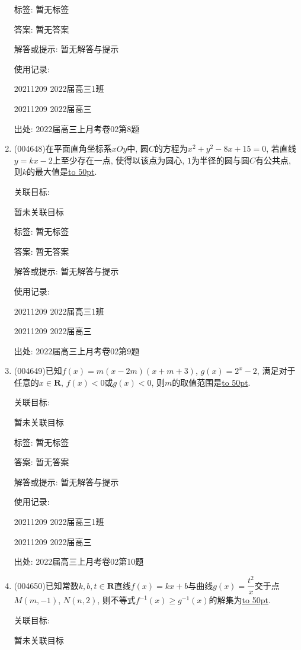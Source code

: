 \documentclass[10pt,a4paper]{article}
\newcommand{\blank}[1]{\underline{\hbox to #1pt{}}}
\begin{document}
\begin{enumerate}[1.]
标签: 暂无标签

答案: 暂无答案

解答或提示: 暂无解答与提示

使用记录:

20211209	2022届高三1班	

20211209	2022届高三	


出处: 2022届高三上月考卷02第8题
\item { (004648)}在平面直角坐标系$xOy$中, 圆$C$的方程为$x^2+y^2-8x+15=0$, 若直线$y=kx-2$上至少存在一点, 使得以该点为圆心, $1$为半径的圆与圆$C$有公共点, 则$k$的最大值是\blank{50}.


关联目标:

暂未关联目标



标签: 暂无标签

答案: 暂无答案

解答或提示: 暂无解答与提示

使用记录:

20211209	2022届高三1班	

20211209	2022届高三	


出处: 2022届高三上月考卷02第9题
\item { (004649)}已知$f(x)=m(x-2m)(x+m+3)$, $g(x)=2^x-2$, 满足对于任意的$x\in \mathbf{R}$, $f(x)<0$或$g(x)<0$, 则$m$的取值范围是\blank{50}.


关联目标:

暂未关联目标



标签: 暂无标签

答案: 暂无答案

解答或提示: 暂无解答与提示

使用记录:

20211209	2022届高三1班	

20211209	2022届高三	


出处: 2022届高三上月考卷02第10题
\item { (004650)}已知常数$k,b,t\in \mathbf{R}$直线$f(x)=kx+b$与曲线$g(x)=\dfrac{t^2}x$交于点$M(m,-1)$, $N(n,2)$, 则不等式$f^{-1}(x)\ge g^{-1}(x)$的解集为\blank{50}.


关联目标:

暂未关联目标




\end{enumerate}
\end{document}
